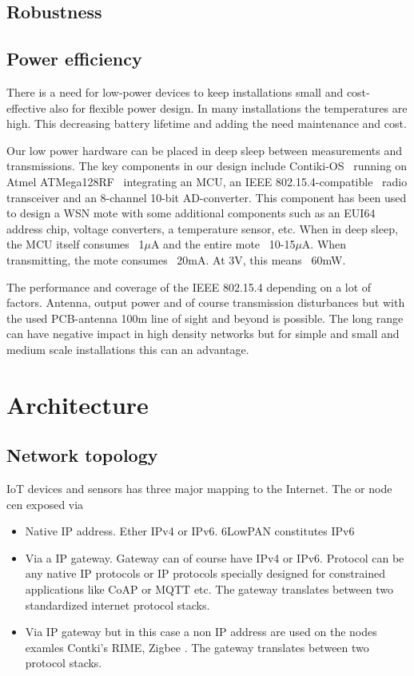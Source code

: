 \documentclass[conference, a4paper,10pt,twocolumn]{IEEEtran}
\begin{document}
\subsection{Robustness}


\subsection{Power efficiency}

There is a need for low-power devices to keep installations small and cost-effective also for 
flexible power design. In many installations the temperatures are high. This decreasing 
battery lifetime and adding the need maintenance and cost.

Our low power hardware can be placed in deep sleep between measurements and transmissions.  The key 
components in our design include  Contiki-OS~\cite{CONTIKI} running on Atmel ATMega128RF~\cite{ATMEGA} 
integrating an MCU, an IEEE 802.15.4-compatible~\cite{802154} radio transceiver and an 8-channel 10-bit 
AD-converter. This component has been used to design a WSN mote with some additional components such 
as an EUI64 address chip, voltage converters, a temperature sensor, etc. When in deep sleep, the MCU 
itself consumes ~1$\mu$A and the entire mote ~10-15$\mu$A. When transmitting, the mote consumes 
~20mA. At 3V, this means ~60mW. 

The performance and coverage of the IEEE 802.15.4 depending on a lot of factors. Antenna, output
power and of course transmission disturbances but with the used PCB-antenna 100m line of sight and 
beyond is possible. The long range can have negative impact in high density networks but for simple 
and small and medium scale installations this can an advantage.


\section{Architecture}
\label{sec:architecture}
 

\subsection{Network topology}

IoT devices and sensors has three major mapping to the Internet. The 
or node cen exposed via

\begin{itemize}

\item Native IP address. Ether IPv4 or IPv6. 6LowPAN constitutes IPv6


\item Via a IP gateway. Gateway can of course have IPv4 or IPv6. Protocol
can be any native IP protocols or IP protocols specially designed 
for constrained applications like CoAP or MQTT etc. The gateway 
translates between two standardized internet protocol stacks. 


\item  Via IP gateway but in this case a non IP address are used on
the nodes examles Contki's RIME, Zigbee . The gateway translates 
between two protocol stacks. 

\end{itemize}
\end{document}
